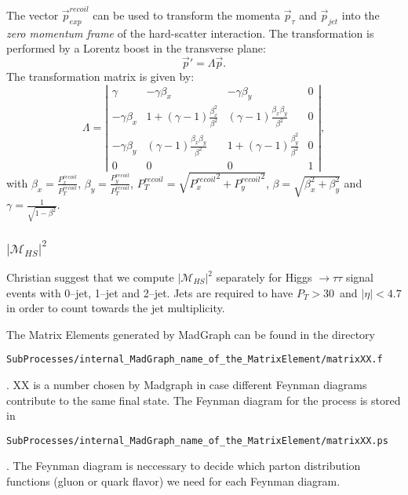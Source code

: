 The vector $\vec{p}_{exp}^{recoil}$ can be used to transform the momenta $\vec{p}_{\tau}$ and $\vec{p}_{jet}$ into the {\em zero momentum frame} of the hard-scatter interaction.
The transformation is performed by a Lorentz boost in the transverse plane:
\begin{equation*}
\vec{p}' = \Lambda \vec{p}.
\end{equation*}
The transformation matrix is given by:
\begin{equation*}
\Lambda = \left| \begin{array}{cccc}
 \gamma & -\gamma \beta_{x} & -\gamma \beta_{y} & 0 \\
 -\gamma \beta_{x} & 1 + (\gamma - 1) \frac{\beta_{x}^2}{\beta^2} & (\gamma - 1) \frac{\beta_{x}\beta_{y}}{\beta^2} & 0 \\
 -\gamma \beta_{y} & (\gamma - 1) \frac{\beta_{x}\beta_{y}}{\beta^2} & 1 + (\gamma - 1) \frac{\beta_{y}^2}{\beta^2} & 0 \\
 0 & 0 & 0 & 1 \end{array} \right|,
\end{equation*}
with $\beta_{x} = \frac{P_{x}^{recoil}}{P_{T}^{recoil}}$, $\beta_{y} = \frac{P_{y}^{recoil}}{P_{T}^{recoil}}$,
$P_{T}^{recoil} = \sqrt{{P_{x}^{recoil}}^2 + {P_{y}^{recoil}}^2}$, $\beta = \sqrt{\beta_{x}^2 + \beta_{y}^2}$ and $\gamma = \frac{1}{\sqrt{1 - \beta^2}}$.

\subsubsection{$\vert \mathcal{M}_{HS} \vert^2$}

Christian suggest that we compute $\vert \mathcal{M}_{HS} \vert^2$ separately for Higgs $\rightarrow \tau\tau$ signal events with 0--jet, 1--jet and 2--jet.
Jets are required to have $P_{T} > 30$~\GeV and $\vert \eta \vert < 4.7$ in order to count towards the jet multiplicity.

The Matrix Elements generated by MadGraph can be found in the directory \begin{verbatim}SubProcesses/internal_MadGraph_name_of_the_MatrixElement/matrixXX.f\end{verbatim} .
XX is a number chosen by Madgraph in case different Feynman diagrams contribute to the same final state.
The Feynman diagram for the process is stored in \begin{verbatim}SubProcesses/internal_MadGraph_name_of_the_MatrixElement/matrixXX.ps\end{verbatim} .
The Feynman diagram is neccessary to decide which parton distribution functions (gluon or quark flavor) we need for each Feynman diagram.


